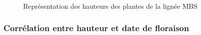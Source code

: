 \documentclass[12pt,a4paper]{article}
\begin{document}
			 				\begin{figure}[h]
			 					\begin{minipage}[t]{0.32\textwidth}
			 					\end{minipage}
			 					\begin{minipage}[t]{0.32\textwidth}
			 					\end{minipage}
			 					\begin{minipage}[t]{0.32\textwidth}
			 					\end{minipage}
			 					\caption{Représentation des hauteurs des plantes de la lignée MBS \label{hauteursmbs}}
			 				\end{figure}
			 
			 			\subsubsection{Corrélation entre hauteur et date de floraison}
			 				
\end{document}
